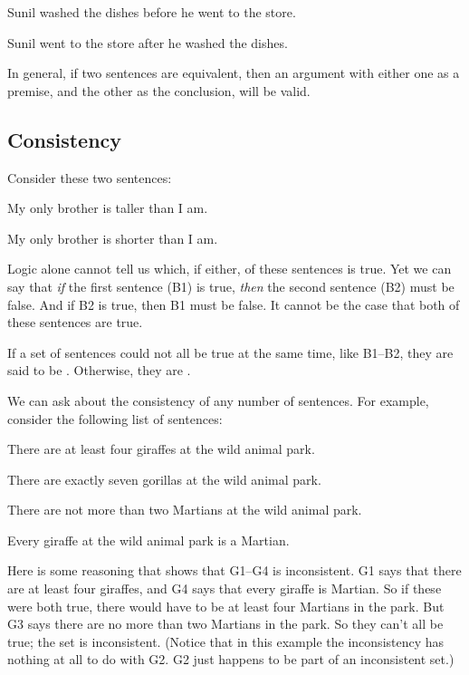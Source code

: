 \begin{earg}
\item[] Sunil washed the dishes before he went to the store.
\item[\therefore] Sunil went to the store after he washed the dishes.
\end{earg}

In general, if two sentences are equivalent, then an argument with either one as a premise, and the other as the conclusion, will be valid.

\subsection{Consistency}
Consider these two sentences:
\begin{ekey}
\item[B1] My only brother is taller than I am.
\item[B2] My only brother is shorter than I am.
\end{ekey}
Logic alone cannot tell us which, if either, of these sentences is true. Yet we can say that \emph{if} the first sentence (B1) is true, \emph{then} the second sentence (B2) must be false. And if B2 is true, then B1 must be false. It cannot be the case that both of these sentences are true.

If a set of sentences could not all be true at the same time, like B1--B2, they are said to be . Otherwise, they are .

We can ask about the consistency of any number of sentences. For example, consider the following list of sentences:
\label{MartianGiraffes}
\begin{ekey}
\item[G1] There are at least four giraffes at the wild animal park.
\item[G2] There are exactly seven gorillas at the wild animal park.
\item[G3] There are not more than two Martians at the wild animal park.
\item[G4] Every giraffe at the wild animal park is a Martian.
\end{ekey}
Here is some reasoning that shows that G1--G4 is inconsistent. G1 says that there are at least four giraffes, and G4 says that every giraffe is Martian. So if these were both true, there would have to be at least four Martians in the park. But G3 says there are no more than two Martians in the park. So they can't all be true; the set is inconsistent. (Notice that in this example the inconsistency has nothing at all to do with G2. G2 just happens to be part of an inconsistent set.)


